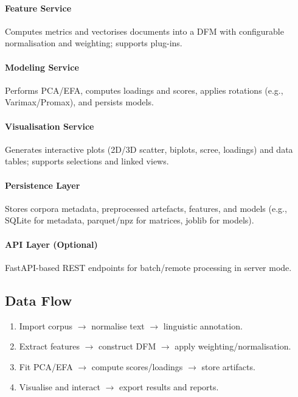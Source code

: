 \paragraph{Feature Service}
Computes metrics and vectorises documents into a DFM with configurable normalisation and weighting; supports plug-ins.

\paragraph{Modeling Service}
Performs PCA/EFA, computes loadings and scores, applies rotations (e.g., Varimax/Promax), and persists models.

\paragraph{Visualisation Service}
Generates interactive plots (2D/3D scatter, biplots, scree, loadings) and data tables; supports selections and linked views.

\paragraph{Persistence Layer}
Stores corpora metadata, preprocessed artefacts, features, and models (e.g., SQLite for metadata, parquet/npz for matrices, joblib for models).

\paragraph{API Layer (Optional)}
FastAPI-based REST endpoints for batch/remote processing in server mode.

\subsection{Data Flow}
\begin{enumerate}
    \item Import corpus $\rightarrow$ normalise text $\rightarrow$ linguistic annotation.
    \item Extract features $\rightarrow$ construct DFM $\rightarrow$ apply weighting/normalisation.
    \item Fit PCA/EFA $\rightarrow$ compute scores/loadings $\rightarrow$ store artifacts.
    \item Visualise and interact $\rightarrow$ export results and reports.
\end{enumerate}


